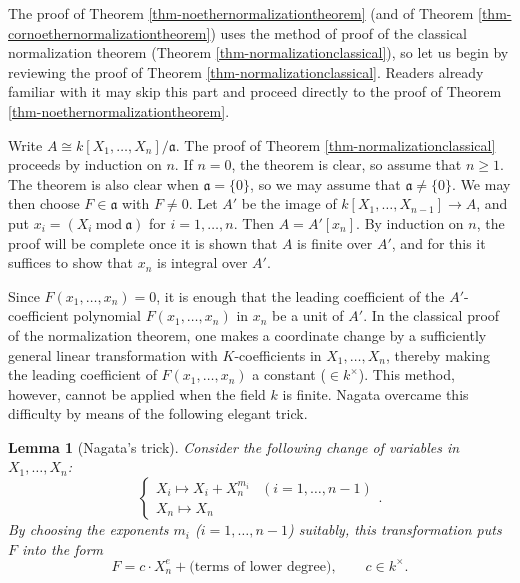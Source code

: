 \documentclass[a4paper,12pt, dvipdfmx]{jsbook}
\theoremstyle{plain}
\newtheorem{lem}[thm]{\bfseries Lemma}
\theoremstyle{definition}
\begin{document}
The proof of Theorem \ref{thm-noethernormalizationtheorem} (and of Theorem \ref{thm-cornoethernormalizationtheorem}) uses the method of proof of the classical normalization theorem (Theorem \ref{thm-normalizationclassical}), so let us begin by reviewing the proof of Theorem \ref{thm-normalizationclassical}.
Readers already familiar with it may skip this part and proceed directly to the proof of Theorem \ref{thm-noethernormalizationtheorem}.

Write $A\cong k[X_1,\ldots,X_n]/\mathfrak{a}$. The proof of Theorem \ref{thm-normalizationclassical} proceeds by induction on $n$.
If $n=0$, the theorem is clear, so assume that $n\geq 1$.
The theorem is also clear when $\mathfrak{a}=\{0\}$, so we may assume that $\mathfrak{a}\neq\{0\}$.
We may then choose $F\in\mathfrak{a}$ with $F\neq 0$.
Let $A'$ be the image of $k[X_1,\ldots,X_{n-1}]\rightarrow A$, and put $x_i=(X_i\ \mathrm{mod}\ \mathfrak{a})$ for $i=1,\ldots,n$.
Then $A=A'[x_n]$.
By induction on $n$, the proof will be complete once it is shown that $A$ is finite over $A'$, and for this it suffices to show that $x_n$ is integral over $A'$.

Since $F(x_1,\ldots,x_n)=0$, it is enough that the leading coefficient of the $A'$-coefficient polynomial $F(x_1,\ldots,x_n)$ in $x_n$ be a unit of $A'$.
In the classical proof of the normalization theorem, one makes a coordinate change by a sufficiently general linear transformation with $K$-coefficients in $X_1,\ldots,X_n$, thereby making the leading coefficient of $F(x_1,\ldots,x_n)$ a constant ($\in k^{\times}$).
This method, however, cannot be applied when the field $k$ is finite.
Nagata \cite[\S14]{Nagata} overcame this difficulty by means of the following elegant trick.
\begin{lem}[{\rm Nagata's trick}]\label{lem-Nagatatrick}{\rm 
Consider the following change of variables in $X_1,\ldots,X_n$:
$$
\begin{cases} X_i\mapsto X_i+X^{m_i}_n&(i=1,\ldots,n-1)\\ X_n\mapsto X_n\end{cases}.
$$
By choosing the exponents $m_i$ ($i=1,\ldots,n-1$) suitably, this transformation puts $F$ into the form
$$
F=c\cdot X^e_n+\textrm{(terms of lower degree)},\qquad c\in k^{\times}.
$$}
\end{lem}
\end{document}

